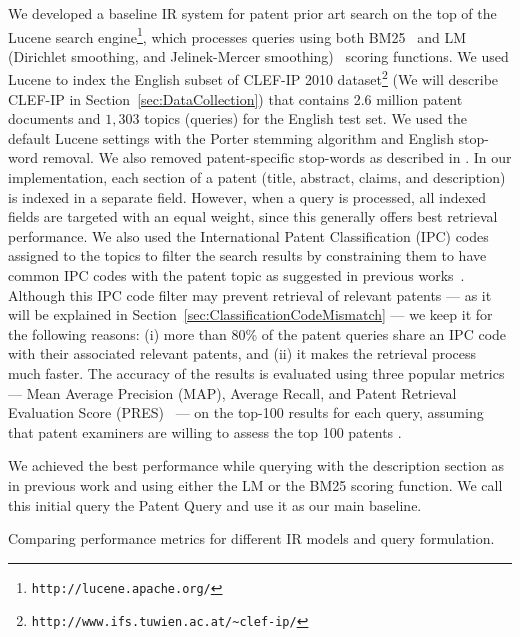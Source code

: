 We developed a baseline IR system for patent prior art search on the top of
the Lucene search engine\footnote{\texttt{http://lucene.apache.org/}}, which processes queries using both BM25~\citep{Robertson1993} and LM (Dirichlet
smoothing, and Jelinek-Mercer smoothing)~\citep{zhai2004study} scoring functions. %
We used Lucene to index the English subset of CLEF-IP 2010 dataset\footnote{\texttt{http://www.ifs.tuwien.ac.at/\textasciitilde{}clef-ip/}} 
(We will describe CLEF-IP in Section~\ref{sec:DataCollection}) that contains 2.6 million patent documents and $1,303$ topics (queries) for the English test set.
We used the default Lucene settings with the Porter stemming algorithm \cite{Porter1980} and English stop-word removal. 
We also removed patent-specific stop-words as described in \cite{magdy2012toward}.
In
our implementation, each section of a patent (title, abstract, claims,
and description) is indexed in a separate field. However, when a query 
is processed, all indexed fields are targeted with an equal weight, since this generally
offers best retrieval performance. We also used the International
Patent Classification (IPC) codes assigned to the topics to filter
the search results by constraining them to have common IPC codes with
the patent topic as suggested in previous works~\citep{lopez2010patatras}.
Although this IPC code filter may prevent retrieval of relevant patents 
--- as it will be explained in Section~\ref{sec:ClassificationCodeMismatch} --- we
keep it for the following reasons: (i) more than 80\%
of the patent queries share an IPC code with their associated relevant
patents, and (ii) it makes the retrieval process much faster. The accuracy of the results is evaluated 
using three popular metrics --- Mean Average Precision (MAP), Average Recall, and Patent Retrieval Evaluation 
Score (PRES)~\citep{magdy2012toward} --- on the top-100 results for each query, assuming that patent examiners 
are willing to assess the top 100 patents \citep{joho2010survey}. 

We achieved the best performance while querying with the description
section as in previous work \citep{xue2009transforming} and using
either the LM or the BM25 scoring function. 
We call this initial 
query the Patent Query and use it as our main baseline.
\begin{savenotes}
\begin{table*}[t!]
  \begin{center}
  \caption{Comparing performance metrics for different IR models and query formulation.}
   
  \label{tab:IRmodels_Sections}
  \end{center}  
\end{table*}
\end{savenotes}

